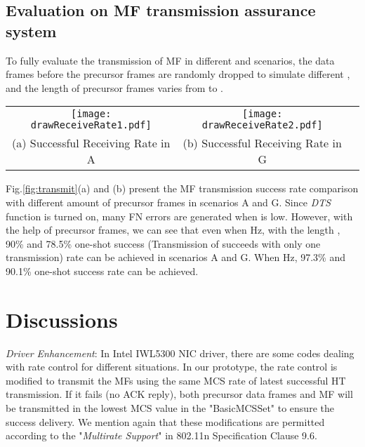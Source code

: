 \documentclass[conference]{IEEEtran}
\begin{document}
\subsection{Evaluation on MF transmission assurance system}
To fully evaluate the transmission of MF in different  and scenarios, the data frames before the precursor frames are randomly dropped to simulate different , and the length of precursor frames  varies from  to .

\begin{figure*}
\begin{center}
\begin{tabular}{ccc}
  \hspace{-0.1in}\texttt{[image: drawReceiveRate1.pdf]}  &
  \texttt{[image: drawReceiveRate2.pdf]} & \hspace{-0.3in}\\
(a)  Successful Receiving Rate in A  & (b) Successful Receiving Rate in G \end{tabular}
\end{center}
\label{fig:transmit}
\vspace{-0.0in}
\end{figure*}

Fig.\ref{fig:transmit}(a) and (b) present the MF transmission success rate comparison with different amount of precursor frames in scenarios A and G. Since \textit{DTS} function is turned on, many FN errors are generated when  is low. However, with the help of precursor frames, we can see that even when Hz, with the length , 90\% and 78.5\% one-shot success (Transmission of  succeeds with only one transmission) rate can be achieved in scenarios A and G. When Hz, 97.3\% and 90.1\% one-shot success rate can be achieved. 


\section{Discussions}
\label{sec:discussion}

\textit{Driver Enhancement}:
In Intel IWL5300 NIC driver, there are some codes dealing with rate control for different situations.
In our prototype, the rate control is modified to transmit the MFs using the same MCS rate of latest successful HT transmission. If it fails (no ACK reply), both precursor data frames and MF will be transmitted in the lowest MCS value in the "BasicMCSSet" to ensure the success delivery. We mention again that these modifications are permitted according to the "\textit{Multirate Support}" in 802.11n Specification\cite{ieee2009ieee} Clause 9.6.
\end{document}
